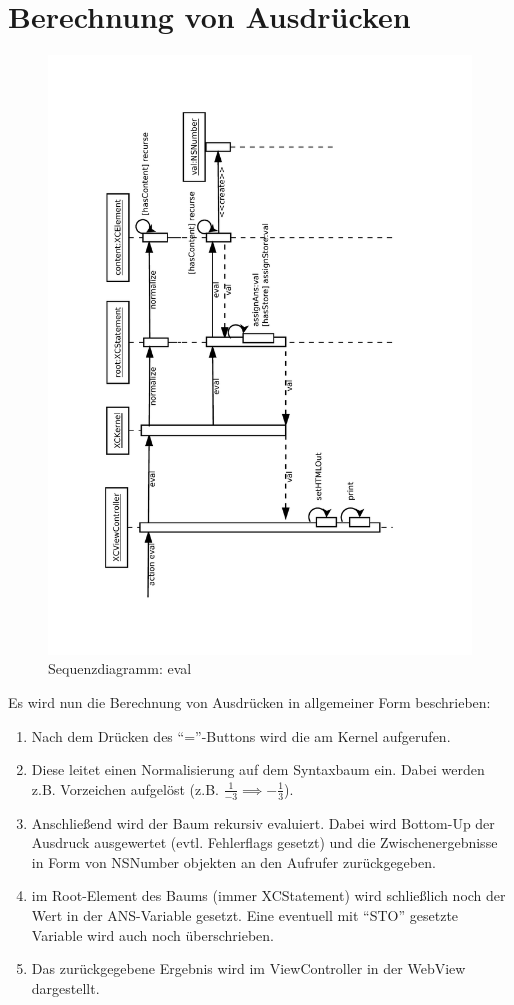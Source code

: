 \section{Berechnung von Ausdrücken}
\begin{figure}[H]
	\centering
	\label{dia:sq:eval}
	\includegraphics[angle=270, width=1\textwidth]{sq_eval.pdf}
	\caption{Sequenzdiagramm: eval}
\end{figure}
Es wird nun die Berechnung von Ausdrücken in allgemeiner Form beschrieben:
\begin{enumerate}
	\item Nach dem Drücken des ``=''-Buttons wird die  am Kernel aufgerufen. 

	\item Diese leitet einen Normalisierung auf dem Syntaxbaum ein. Dabei werden z.B. Vorzeichen aufgelöst (z.B. $\frac 1 {-3} \implies -\frac1 3$).  
	\item Anschließend wird der Baum rekursiv evaluiert.
	Dabei wird Bottom-Up der Ausdruck ausgewertet (evtl. Fehlerflags gesetzt) und 
	die Zwischenergebnisse in Form von NSNumber objekten an den Aufrufer zurückgegeben.  
	\item im Root-Element des Baums (immer XCStatement) wird schließlich noch der Wert in der ANS-Variable gesetzt. Eine eventuell mit ``STO'' gesetzte Variable wird auch noch überschrieben.  
	\item Das zurückgegebene Ergebnis wird im ViewController in der WebView dargestellt.
\end{enumerate}

